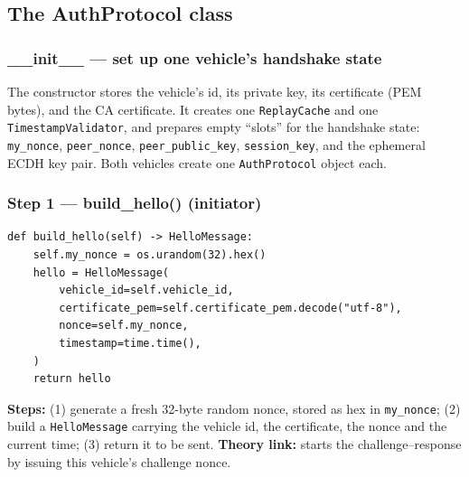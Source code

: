 \documentclass[11pt,a4paper]{report}
\begin{document}
\subsection{The AuthProtocol class}

\subsubsection*{\_\_init\_\_ --- set up one vehicle's handshake state}
The constructor stores the vehicle's id, its private key, its certificate (PEM
bytes), and the CA certificate. It creates one \texttt{ReplayCache} and one
\texttt{TimestampValidator}, and prepares empty ``slots'' for the handshake
state: \texttt{my\_nonce}, \texttt{peer\_nonce}, \texttt{peer\_public\_key},
\texttt{session\_key}, and the ephemeral ECDH key pair. Both vehicles create one
\texttt{AuthProtocol} object each.

\subsubsection*{Step 1 --- build\_hello() (initiator)}
\begin{lstlisting}[style=py,caption={auth\_protocol.py --- Step 1: build the HELLO.}]
def build_hello(self) -> HelloMessage:
    self.my_nonce = os.urandom(32).hex()
    hello = HelloMessage(
        vehicle_id=self.vehicle_id,
        certificate_pem=self.certificate_pem.decode("utf-8"),
        nonce=self.my_nonce,
        timestamp=time.time(),
    )
    return hello
\end{lstlisting}
\textbf{Steps:} (1) generate a fresh 32-byte random nonce, stored as hex in
\texttt{my\_nonce}; (2) build a \texttt{HelloMessage} carrying the vehicle id,
the certificate, the nonce and the current time; (3) return it to be sent.
\textbf{Theory link:} starts the challenge--response by issuing this vehicle's
challenge nonce.
\end{document}
